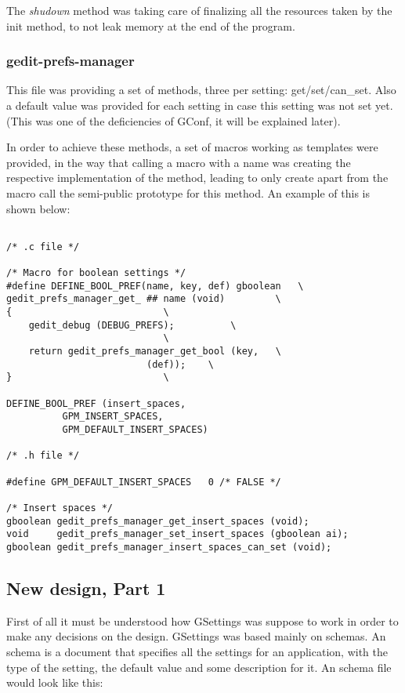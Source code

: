 The \emph{shudown} method was taking care of finalizing all the resources taken by the init method, to not leak memory at the end of the program.

\subsubsection*{gedit-prefs-manager}

This file was providing a set of methods, three per setting: get/set/can\_set. Also a default value was provided for each setting in case this setting was not set yet. (This was one of the deficiencies of GConf, it will be explained later).

In order to achieve these methods, a set of macros working as templates were provided, in the way that calling a macro with a name was creating the respective implementation of the method, leading to only create apart from the macro call the semi-public prototype for this method. An example of this is shown below:

\begin{lstlisting}[style=GObject]

/* .c file */

/* Macro for boolean settings */
#define DEFINE_BOOL_PREF(name, key, def) gboolean 	\
gedit_prefs_manager_get_ ## name (void)			\
{							\
	gedit_debug (DEBUG_PREFS);			\
							\
	return gedit_prefs_manager_get_bool (key,	\
					     (def));	\
}							\

DEFINE_BOOL_PREF (insert_spaces,
		  GPM_INSERT_SPACES,
		  GPM_DEFAULT_INSERT_SPACES)

/* .h file */

#define GPM_DEFAULT_INSERT_SPACES	0 /* FALSE */

/* Insert spaces */
gboolean gedit_prefs_manager_get_insert_spaces (void);
void	 gedit_prefs_manager_set_insert_spaces (gboolean ai);
gboolean gedit_prefs_manager_insert_spaces_can_set (void);

\end{lstlisting}

\subsection{New design, Part 1}

First of all it must be understood how GSettings was suppose to work in order to make any decisions on the design. GSettings was based mainly on schemas. An schema is a document that specifies all the settings for an application, with the type of the setting, the default value and some description for it. An schema file would look like this:

